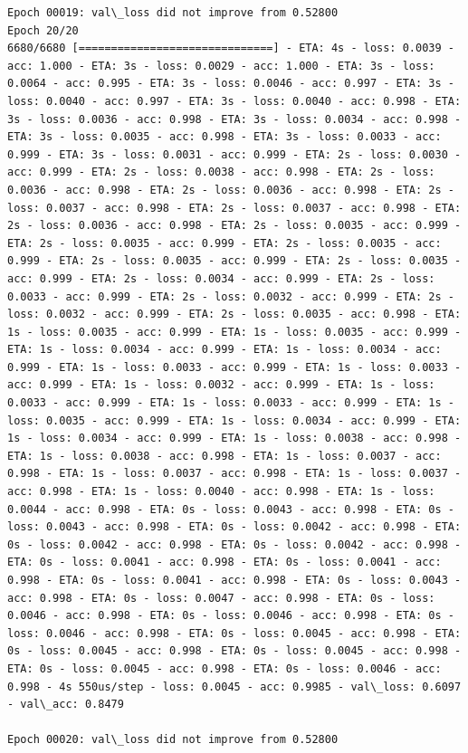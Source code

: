 \documentclass[11pt]{article}
\begin{document}
\begin{Verbatim}[commandchars=\\\{\}]
Epoch 00019: val\_loss did not improve from 0.52800
Epoch 20/20
6680/6680 [==============================] - ETA: 4s - loss: 0.0039 - acc: 1.000 - ETA: 3s - loss: 0.0029 - acc: 1.000 - ETA: 3s - loss: 0.0064 - acc: 0.995 - ETA: 3s - loss: 0.0046 - acc: 0.997 - ETA: 3s - loss: 0.0040 - acc: 0.997 - ETA: 3s - loss: 0.0040 - acc: 0.998 - ETA: 3s - loss: 0.0036 - acc: 0.998 - ETA: 3s - loss: 0.0034 - acc: 0.998 - ETA: 3s - loss: 0.0035 - acc: 0.998 - ETA: 3s - loss: 0.0033 - acc: 0.999 - ETA: 3s - loss: 0.0031 - acc: 0.999 - ETA: 2s - loss: 0.0030 - acc: 0.999 - ETA: 2s - loss: 0.0038 - acc: 0.998 - ETA: 2s - loss: 0.0036 - acc: 0.998 - ETA: 2s - loss: 0.0036 - acc: 0.998 - ETA: 2s - loss: 0.0037 - acc: 0.998 - ETA: 2s - loss: 0.0037 - acc: 0.998 - ETA: 2s - loss: 0.0036 - acc: 0.998 - ETA: 2s - loss: 0.0035 - acc: 0.999 - ETA: 2s - loss: 0.0035 - acc: 0.999 - ETA: 2s - loss: 0.0035 - acc: 0.999 - ETA: 2s - loss: 0.0035 - acc: 0.999 - ETA: 2s - loss: 0.0035 - acc: 0.999 - ETA: 2s - loss: 0.0034 - acc: 0.999 - ETA: 2s - loss: 0.0033 - acc: 0.999 - ETA: 2s - loss: 0.0032 - acc: 0.999 - ETA: 2s - loss: 0.0032 - acc: 0.999 - ETA: 2s - loss: 0.0035 - acc: 0.998 - ETA: 1s - loss: 0.0035 - acc: 0.999 - ETA: 1s - loss: 0.0035 - acc: 0.999 - ETA: 1s - loss: 0.0034 - acc: 0.999 - ETA: 1s - loss: 0.0034 - acc: 0.999 - ETA: 1s - loss: 0.0033 - acc: 0.999 - ETA: 1s - loss: 0.0033 - acc: 0.999 - ETA: 1s - loss: 0.0032 - acc: 0.999 - ETA: 1s - loss: 0.0033 - acc: 0.999 - ETA: 1s - loss: 0.0033 - acc: 0.999 - ETA: 1s - loss: 0.0035 - acc: 0.999 - ETA: 1s - loss: 0.0034 - acc: 0.999 - ETA: 1s - loss: 0.0034 - acc: 0.999 - ETA: 1s - loss: 0.0038 - acc: 0.998 - ETA: 1s - loss: 0.0038 - acc: 0.998 - ETA: 1s - loss: 0.0037 - acc: 0.998 - ETA: 1s - loss: 0.0037 - acc: 0.998 - ETA: 1s - loss: 0.0037 - acc: 0.998 - ETA: 1s - loss: 0.0040 - acc: 0.998 - ETA: 1s - loss: 0.0044 - acc: 0.998 - ETA: 0s - loss: 0.0043 - acc: 0.998 - ETA: 0s - loss: 0.0043 - acc: 0.998 - ETA: 0s - loss: 0.0042 - acc: 0.998 - ETA: 0s - loss: 0.0042 - acc: 0.998 - ETA: 0s - loss: 0.0042 - acc: 0.998 - ETA: 0s - loss: 0.0041 - acc: 0.998 - ETA: 0s - loss: 0.0041 - acc: 0.998 - ETA: 0s - loss: 0.0041 - acc: 0.998 - ETA: 0s - loss: 0.0043 - acc: 0.998 - ETA: 0s - loss: 0.0047 - acc: 0.998 - ETA: 0s - loss: 0.0046 - acc: 0.998 - ETA: 0s - loss: 0.0046 - acc: 0.998 - ETA: 0s - loss: 0.0046 - acc: 0.998 - ETA: 0s - loss: 0.0045 - acc: 0.998 - ETA: 0s - loss: 0.0045 - acc: 0.998 - ETA: 0s - loss: 0.0045 - acc: 0.998 - ETA: 0s - loss: 0.0045 - acc: 0.998 - ETA: 0s - loss: 0.0046 - acc: 0.998 - 4s 550us/step - loss: 0.0045 - acc: 0.9985 - val\_loss: 0.6097 - val\_acc: 0.8479

Epoch 00020: val\_loss did not improve from 0.52800

    \end{Verbatim}
\end{document}
